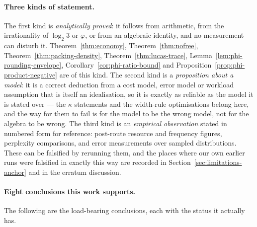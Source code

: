 \documentclass[11pt]{article}
\theoremstyle{definition}
\begin{document}
\paragraph{Three kinds of statement.} The first kind is \emph{analytically
proved}: it follows from arithmetic, from the irrationality of $\log_2 3$ or
$\varphi$, or from an algebraic identity, and no measurement can disturb it.
Theorem~\ref{thm:economy}, Theorem~\ref{thm:nofree},
Theorem~\ref{thm:packing-density}, Theorem~\ref{thm:lucas-trace},
Lemma~\ref{lem:phi-rounding-envelope}, Corollary~\ref{cor:phi-ratio-bound} and
Proposition~\ref{prop:phi-product-negative} are of this kind. The second kind is a
\emph{proposition about a model}: it is a correct deduction from a cost model,
error model or workload assumption that is itself an idealisation, so it is exactly
as reliable as the model it is stated over --- the $\kappa$ statements and the
width-rule optimisations belong here, and the way for them to fail is for the
model to be the wrong model, not for the algebra to be wrong. The third kind is an
\emph{empirical observation} stated in numbered form for reference: post-route
resource and frequency figures, perplexity comparisons, and error measurements
over sampled distributions. These can be falsified by rerunning them, and the
places where our own earlier runs were falsified in exactly this way are recorded
in Section~\ref{sec:limitations-anchor} and in the erratum discussion.

\paragraph{Eight conclusions this work supports.} The following are the load-bearing
conclusions, each with the status it actually has.
\end{document}
